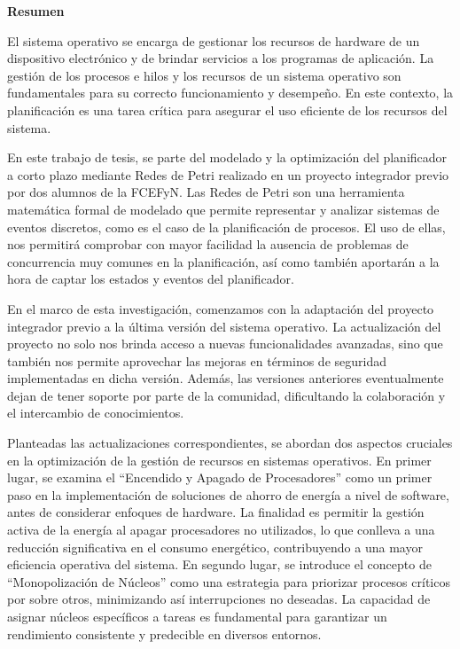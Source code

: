 \begin{Large}
    \textbf{Resumen}
    \vspace{.5cm}
\end{Large}

El sistema operativo se encarga de gestionar los recursos de hardware de un dispositivo electrónico y de brindar servicios a los programas de aplicación. La gestión de los procesos e hilos y los recursos de un sistema operativo son fundamentales para su correcto funcionamiento y desempeño. En este contexto, la planificación es una tarea crítica para asegurar el uso eficiente de los recursos del sistema.\par

En este trabajo de tesis, se parte del modelado y la optimización del planificador a corto plazo mediante Redes de Petri realizado en un proyecto integrador previo por dos alumnos de la FCEFyN. Las Redes de Petri son una herramienta matemática formal de modelado que permite representar y analizar sistemas de eventos discretos, como es el caso de la planificación de procesos. El uso de ellas, nos permitirá comprobar con mayor facilidad la ausencia de problemas de concurrencia muy comunes en la planificación, así como también aportarán a la hora de captar los estados y eventos del planificador.\par

En el marco de esta investigación, comenzamos con la adaptación del proyecto integrador previo a la última versión del sistema operativo. La actualización del proyecto no solo nos brinda acceso a nuevas funcionalidades avanzadas, sino que también nos permite aprovechar las mejoras en términos de seguridad implementadas en dicha versión. Además, las versiones anteriores eventualmente dejan de tener soporte por parte de la comunidad, dificultando la colaboración y el intercambio de conocimientos.\par

Planteadas las actualizaciones correspondientes, se abordan dos aspectos cruciales en la optimización de la gestión de recursos en sistemas operativos. En primer lugar, se examina el ``Encendido y Apagado de Procesadores'' como un primer paso en la implementación de soluciones de ahorro de energía a nivel de software, antes de considerar enfoques de hardware. La finalidad es permitir la gestión activa de la energía al apagar procesadores no utilizados, lo que conlleva a una reducción significativa en el consumo energético, contribuyendo a una mayor eficiencia operativa del sistema. En segundo lugar, se introduce el concepto de ``Monopolización de Núcleos'' como una estrategia para priorizar procesos críticos por sobre otros, minimizando así interrupciones no deseadas. La capacidad de asignar núcleos específicos a tareas es fundamental para garantizar un rendimiento consistente y predecible en diversos entornos. \par